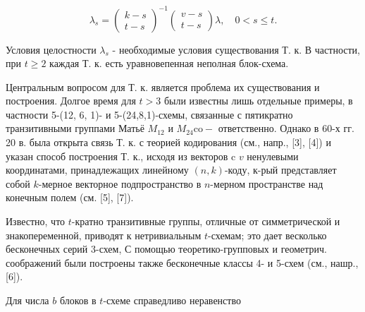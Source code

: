 \documentclass[10pt]{article}
\begin{document}
\[

\lambda_{s}=\left(\begin{array}{c}

k-s \\

t-s

\end{array}\right)^{-1}\left(\begin{array}{c}

v-s \\

t-s

\end{array}\right) \lambda, \quad 0<s \leqslant t .

\]



Условия целостности $\lambda_{s}$ - необходимые условия существования Т. к. В частности, при $t \geqslant 2$ каждая Т. к. есть уравновепенная неполная блок-схема.



Центральным вопросом для Т. к. является проблема их существования и построения. Долгое время для $t>3$ были известны лишь отдельные примеры, в частности 5-(12, 6, 1)- и 5-(24,8,1)-схемы, связанные с пятикратно транзитивными группами Матьё $M_{12}$ и $M_{24} \mathrm{co-}$ ответственно. Однако в 60-х гг. 20 в. была открыта связь Т. к. с теорией кодирования (см., напр., [3], [4]) и указан способ построения Т. к., исходя из векторов c $v$ ненулевыми координатами, принадлежащих линейному $(n, k)$-коду, к-рый представляет собой $k$-мерное векторное подпространство в $n$-мерном пространстве над конечным полем (см. [5], [7]).



Известно, что $t$-кратно транзитивные группы, отличные от симметрической и знакопеременной, приводят к нетривиальным $t$-схемам; это дает весколько бесконечных серий 3-схем, С помощью теоретико-групповых и геометрич. соображений были построены также бесконечные классы 4- и 5-схем (см., нашр., [6]).



Для числа $b$ блоков в $t$-схеме справедливо неравенство
\end{document}
